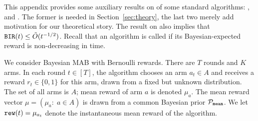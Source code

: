

\newcommand{\ExplorExploit}{\term{ExplorExploit}}
\newcommand{\PhasedExplorExploit}{\term{PhasedExplorExploit}}
\newcommand{\SuccesiveEliminationReset}{\term{SuccesiveEliminationReset}}

\newcommand{\IReg}{R^{\term{inst}}} %




This appendix provides some auxiliary results on \bmonotonicity of some standard algorithms: \DynGreedy, \DynamicEpsGreedy and \Thompson. The former is needed in Section~\ref{sec:theory}, the last two merely add motivation for our theoretical story. The result on \Thompson also implies that $\mathtt{BIR}(t)\leq \tilde{O}(t^{-1/2})$. Recall that an algorithm is called \bmonotone if its Bayesian-expected reward is non-decreasing in time.

We consider Bayesian MAB with Bernoulli rewards. There are $T$ rounds and $K$ arms. In each round $t\in [T]$, the algorithm chooses an arm $a_t\in A$ and receives a reward $r_t\in\{0,1\}$ for this arm, drawn from a fixed but unknown distribution. The set of all arms is $A$; mean reward of arm $a$ is denoted $\mu_a$. The mean reward vector $\mu = (\mu_a:\; a\in A)$ is drawn from a common Bayesian prior $\mathcal{P}_\mathtt{mean}$.
We let
    $\mathtt{rew}(t) = \mu_{a_t}$
denote the instantaneous mean reward of the algorithm.


